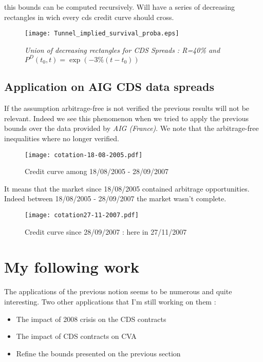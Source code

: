 this  bounds can  be  computed recursively.  Will have  a  series of  decreasing
rectangles in wich every cds credit curve should cross.
\begin{figure}[H]
  \centering
  \texttt{[image: Tunnel\_implied\_survival\_proba.eps]}
  \caption{\it Union of decreasing rectangles for CDS Spreads : R=40\% and $P^D(t_0,t) = \exp(-3\%(t-t_0))$}
\end{figure}

\subsection{Application on AIG CDS data spreads}
\label{sec:application-aig-cds}

\quad If the assumption arbitrage-free is not verified the previous results will not
be relevant. Indeed we  see this phenomenon when we tried  to apply the previous
bounds  over  the  data  provided  by  {\it AIG  (France)}.  We  note  that  the
arbitrage-free inequalities where no longer verified. \\

\begin{figure}[H]
  \label{fig:5}
  \centering
  \texttt{[image: cotation-18-08-2005.pdf]}
  \caption{Credit curve among 18/08/2005 -  28/09/2007}
\end{figure}

It   means    that   the    market   since   18/08/2005    contained   arbitrage
opportunities.  Indeed  between  18/08/2005   -  28/09/2007  the  market  wasn't
complete.
 
\begin{figure}[H]
  \centering
  \texttt{[image: cotation27-11-2007.pdf]}
  \caption{Credit curve since 28/09/2007 : here in 27/11/2007}
\end{figure}

\section{My following work}
\label{sec:my-following-work}

The  applications  of  the  previous  notion seems  to  be  numerous  and  quite
interesting. Two other applications that I'm still working on them :
\begin{itemize}
\item The impact of 2008 crisis on the CDS contracts
\item The impact of CDS contracts on CVA
\item Refine the bounds presented on the previous section
\end{itemize}

